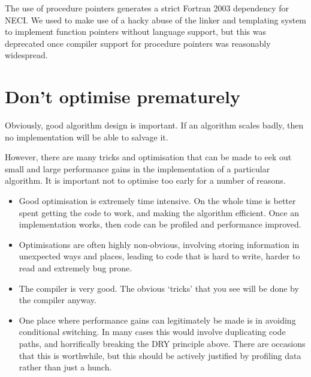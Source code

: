 \documentclass[a4paper,notitlepage]{scrreprt}
\newcommand\headitem[1]{\needspace{1.5\baselineskip}\item[{\boldmath #1 \nopagebreak}] \hfill \\ \nopagebreak}
\begin{document}
		The use of procedure pointers generates a strict Fortran 2003
		dependency for NECI. We used to make use of a hacky abuse of the
		linker and templating system to implement function pointers without
		language support, but this was deprecated once compiler support
		for procedure pointers was reasonably widespread.
		
%
%

\section{Don't optimise prematurely}
	Obviously, good algorithm design is important. If an algorithm scales
	badly, then no implementation will be able to salvage it.
	
	However, there are many tricks and optimisation that can be made to
	eek out small and large performance gains in the implementation of a
	particular algorithm. It is important not to optimise too early for a
	number of reasons.
	\begin{itemize}
		\item
			Good optimisation is extremely time intensive. On the whole time
			is better spent getting the code to work, and making the
			algorithm efficient. Once an implementation works, then code can
			be profiled and performance improved.
		\item
			Optimisations are often highly non-obvious, involving storing
			information in unexpected ways and places, leading to code that
			is hard to write, harder to read and extremely bug prone.
		\item
			The compiler is very good. The obvious `tricks' that you see will
			be done by the compiler anyway.
		\item
			One place where performance gains can legitimately be made is in
			avoiding conditional switching. In many cases this would involve
			duplicating code paths, and horrifically breaking the DRY
			principle above. There are occasions that this is worthwhile, but
			this should be actively justified by profiling data rather than
			just a hunch.
	\end{itemize}
\end{document}
